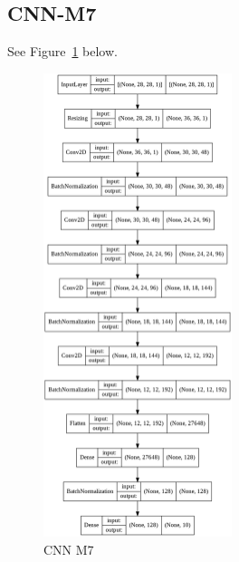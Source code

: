 \documentclass{article}
\begin{document}
\subsection{CNN-M7} \label{cnn_7}
See Figure~\ref{cnn_m7_demo} below.
\begin{figure}[h]
    \centering
    \includegraphics[width=0.49\textwidth]{figure/custom-m7.png}
    \caption{CNN M7}
    \label{cnn_m7_demo}
\end{figure}
\end{document}

